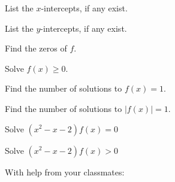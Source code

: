 \begin{exenum}
\item  List the $x$-intercepts, if any exist.
\item  List the $y$-intercepts, if any exist.

\item  Find the zeros of $f$.
\item  Solve $f(x) \geq 0$.

\item  Find the number of solutions to $f(x) = 1$.
\item   Find the number of solutions to $|f(x)| = 1$.

\item   Solve $(x^2-x-2)f(x) = 0$
\item   Solve  $(x^2-x-2)f(x) > 0$

\end{exenum}

With help from your classmates:


